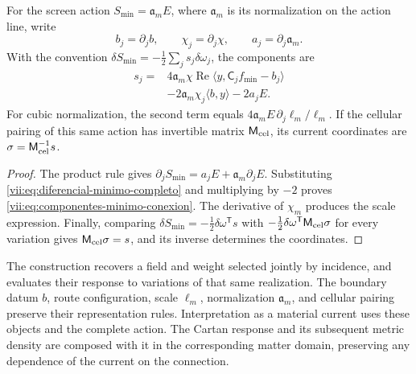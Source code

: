 \begin{theorem}
\label{vii:thm:componentes-minimo-conexion}
For the screen action
\(S_{\min}=\mathfrak a_m E\), where \(\mathfrak a_m\) is its
normalization on the action line, write
\[
 b_j=\partial_jb,\qquad \chi_j=\partial_j\chi,
 \qquad a_j=\partial_j\mathfrak a_m.
\]
With the convention \(\delta S_{\min}=-\tfrac12\sum_j s_j\delta\omega_j\),
the components are
\begin{equation}
 \begin{split}
 s_j={}&4\mathfrak a_m\chi\operatorname{Re}
             \langle y,\mathsf C_jf_{\min}-b_j\rangle\\
      &-2\mathfrak a_m\chi_j\langle b,y\rangle-2a_jE.
 \end{split}
 \label{vii:eq:componentes-minimo-conexion}
\end{equation}
For cubic normalization, the second term equals
\(4\mathfrak a_m E\,\partial_j\ell_m/\ell_m\).
If the cellular pairing of this same action has invertible matrix
\(\mathsf M_{\rm cel}\), its current coordinates
are \(\sigma=\mathsf M_{\rm cel}^{-1}s\).
\end{theorem}

\begin{proof}
The product rule gives
\(\partial_jS_{\min}=a_jE+\mathfrak a_m\partial_jE\).
Substituting \eqref{vii:eq:diferencial-minimo-completo} and multiplying
by \(-2\) proves \eqref{vii:eq:componentes-minimo-conexion}.
The derivative of \(\chi_m\) produces the scale expression.
Finally, comparing
\(\delta S_{\min}=-\tfrac12\delta\omega^{\mathsf T}s\)
with \(-\tfrac12\delta\omega^{\mathsf T}\mathsf M_{\rm cel}\sigma\)
for every variation gives \(\mathsf M_{\rm cel}\sigma=s\),
and its inverse determines the coordinates.
\end{proof}

The construction recovers a field and weight selected jointly
by incidence, and evaluates their response to variations of that same
realization. The boundary datum \(b\), route configuration, scale
\(\ell_m\), normalization \(\mathfrak a_m\), and cellular
pairing preserve their representation rules. Interpretation as a
material current uses these objects and the complete action. The
Cartan response and its subsequent metric density are composed with
it in the corresponding matter domain, preserving any
dependence of the current on the connection.
